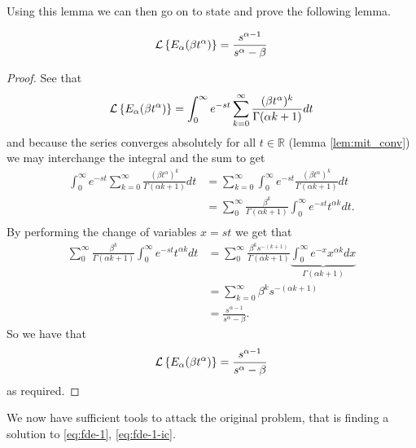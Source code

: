 \documentclass{unswmaths}
\begin{document}
Using this lemma we can then go on to state and prove the following lemma.

\begin{lemma}
\label{lem:lap_mit}
	\begin{align*}	
		\mathcal{L} \left\{  E_\alpha (\beta t^\alpha) \right\} = \frac{s^{\alpha - 1}}{s^\alpha - \beta}
	\end{align*}
\end{lemma}
\begin{proof}
	See that
	\begin{align*}
		\mathcal{L} \left\{  E_\alpha (\beta t^\alpha) \right\} = \int_0^\infty e^{-st} \sum_{k=0}^\infty \frac{(\beta t^\alpha)^k}{\Gamma(\alpha k+1)} dt
	\end{align*}
	and because the series converges absolutely for all $ t \in \mathbb{R} $ (lemma \ref{lem:mit_conv}) we may interchange the integral
	and the sum to get
	\begin{align*}
		\int_0^\infty e^{-st} \sum_{k=0}^\infty \frac{(\beta t^\alpha)^k}{\Gamma(\alpha k+1)} dt &= \sum_{k=0}^\infty \int_0^\infty e^{-st} \frac{(\beta t^\alpha)^k}{\Gamma(\alpha k + 1)} dt \\
			&= \sum_0^\infty \frac{\beta^k}{\Gamma(\alpha k + 1)} \int_0^\infty e^{-st} t^{\alpha k} dt. \\
	\end{align*}
	By performing the change of variables $ x =st $ we get that 
	\begin{align*}
		\sum_0^\infty \frac{\beta^k}{\Gamma(\alpha k + 1)} \int_0^\infty e^{-st} t^{\alpha k} dt 
			&= \sum_0^\infty \frac{\beta^k s^{-(k+1)}}{\Gamma(\alpha k + 1)} \underbrace{\int_0^\infty e^{-x} x^{\alpha k} dx}_{\Gamma(\alpha k + 1)} \\
			&= \sum_{k=0}^\infty \beta^{k} s^{-(\alpha k + 1)} \\
			&= \frac{s^{\alpha-1}}{s^\alpha - \beta}.		
	\end{align*}
	So we have that 
	\begin{align*}	
		\mathcal{L} \left\{  E_\alpha (\beta t^\alpha) \right\} = \frac{s^{\alpha - 1}}{s^\alpha - \beta}
	\end{align*}	
	as required.
\end{proof}

We now have sufficient tools to attack the original problem, that is finding a solution to \eqref{eq:fde-1}, \eqref{eq:fde-1-ic}.
\end{document}
